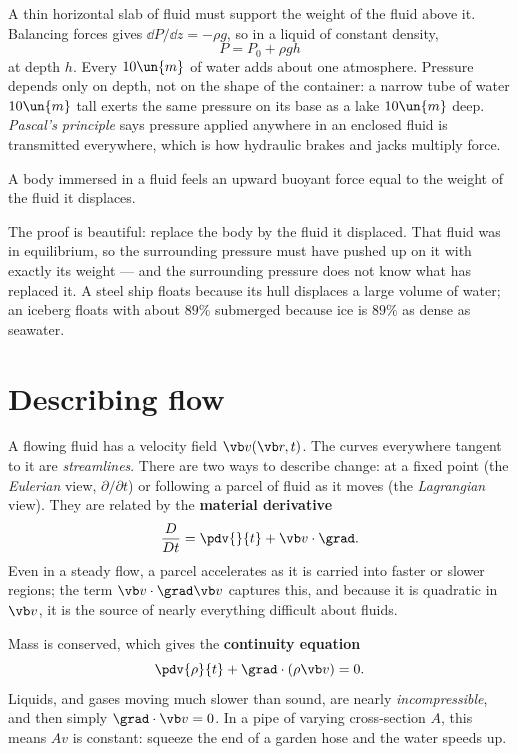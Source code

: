 A thin horizontal slab of fluid must support the weight of the fluid above it. Balancing forces gives $\dd P/\dd z = -\rho g$, so in a liquid of constant density,
\[
  P = P_0 + \rho g h
\]
at depth $h$. Every $10\un{m}$ of water adds about one atmosphere. Pressure depends only on depth, not on the shape of the container: a narrow tube of water $10\un{m}$ tall exerts the same pressure on its base as a lake $10\un{m}$ deep. \emph{Pascal's principle} says pressure applied anywhere in an enclosed fluid is transmitted everywhere, which is how hydraulic brakes and jacks multiply force.

\begin{law}
A body immersed in a fluid feels an upward buoyant force equal to the weight of the fluid it displaces.
\end{law}
The proof is beautiful: replace the body by the fluid it displaced. That fluid was in equilibrium, so the surrounding pressure must have pushed up on it with exactly its weight --- and the surrounding pressure does not know what has replaced it. A steel ship floats because its hull displaces a large volume of water; an iceberg floats with about $89\%$ submerged because ice is $89\%$ as dense as seawater.

\section{Describing flow}

A flowing fluid has a velocity field $\vb v(\vb r,t)$. The curves everywhere tangent to it are \emph{streamlines}. There are two ways to describe change: at a fixed point (the \emph{Eulerian} view, $\partial/\partial t$) or following a parcel of fluid as it moves (the \emph{Lagrangian} view). They are related by the \textbf{material derivative}
\[
  \frac{D}{Dt} = \pdv{}{t} + \vb v\cdot\grad .
\]
Even in a steady flow, a parcel accelerates as it is carried into faster or slower regions; the term $\vb v\cdot\grad\vb v$ captures this, and because it is quadratic in $\vb v$, it is the source of nearly everything difficult about fluids.

Mass is conserved, which gives the \textbf{continuity equation}
\[
  \pdv{\rho}{t} + \grad\cdot(\rho\vb v) = 0 .
\]
Liquids, and gases moving much slower than sound, are nearly \emph{incompressible}, and then simply $\grad\cdot\vb v = 0$. In a pipe of varying cross-section $A$, this means $Av$ is constant: squeeze the end of a garden hose and the water speeds up.

